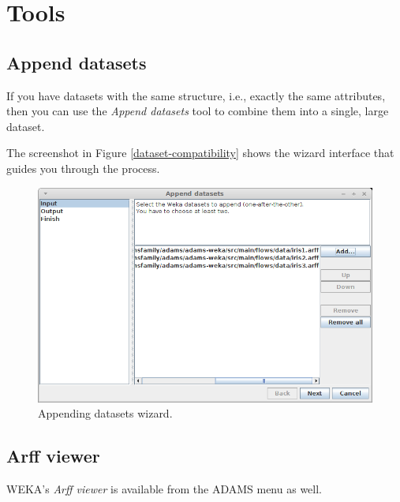%

\chapter{Tools}

\section{Append datasets}

If you have datasets with the same structure, i.e., exactly the same
attributes, then you can use the \textit{Append datasets} tool to combine
them into a single, large dataset.

The screenshot in Figure \ref{dataset-compatibility} shows the wizard
interface that guides you through the process.

\begin{figure}[htb]
  \centering
  \includegraphics[width=12.0cm]{images/append_datasets.png}
  \caption{Appending datasets wizard.}
  \label{append_datasets}
\end{figure}

\clearpage
\section{Arff viewer}

WEKA's \textit{Arff viewer} is available from the ADAMS menu as well.

